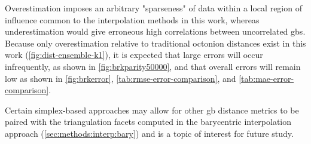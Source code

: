 \documentclass[preprint,12pt]{elsarticle}
\begin{document}
Overestimation imposes an arbitrary "sparseness" of data within a local region of influence common to the interpolation methods in this work, whereas underestimation would give erroneous high correlations between uncorrelated \glspl{gb}. Because only overestimation relative to traditional octonion distances exist in this work (\cref{fig:dist-ensemble-k1}), it is expected that large errors will occur infrequently, as shown in \cref{fig:brkparity50000}, and that overall errors will remain low as shown in \cref{fig:brkerror}, \cref{tab:rmse-error-comparison}, and \cref{tab:mae-error-comparison}.

Certain simplex-based approaches \cite{connorHighdimensionalSimplexesSupermetric2017,boissonnatOnlyDistancesAre2017} may allow for other \gls{gb} distance metrics \cite{morawiecDistancesGrainInterfaces2019} to be paired with the triangulation facets computed in the barycentric interpolation approach (\cref{sec:methods:interp:bary}) and is a topic of interest for future study.

\end{document}
